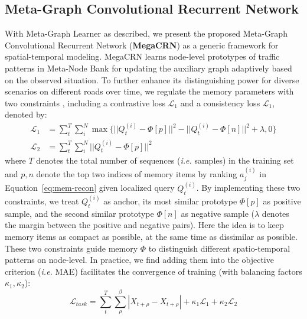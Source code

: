 \documentclass[letterpaper]{article} \usepackage{aaai23}  \usepackage{times}  \usepackage{helvet}  \usepackage{courier}  \usepackage[hyphens]{url}  \usepackage{graphicx} \urlstyle{rm} \def\UrlFont{\rm}  \usepackage{natbib}  \usepackage{caption} \usepackage{multirow}
\begin{document}
\subsection{Meta-Graph Convolutional Recurrent Network}
With Meta-Graph Learner as described, we present the proposed Meta-Graph Convolutional Recurrent Network (\textbf{MegaCRN}) as a generic framework for spatial-temporal modeling. MegaCRN learns node-level prototypes of traffic patterns in Meta-Node Bank for updating  the auxiliary graph adaptively based on the observed situation. To further enhance its distinguishing power for diverse scenarios on different roads over time, we regulate the memory parameters with two constraints \cite{gong2019memorizing, park2020learning}, including a contrastive loss $\mathcal{L}_{1}$ and a consistency loss $\mathcal{L}_{1}$, denoted by:
\begin{equation} \label{eq:mem-loss}
	    \begin{aligned}
\mathcal{L}_{1} & = \mathop{\sum}_t^T \mathop{\sum}_i^N \max\{||Q_t^{(i)} - \Phi[p]||^2 - ||Q_t^{(i)} - \Phi[n]||^2 + \lambda, 0\}\\
		\mathcal{L}_{2} & = \mathop{\sum}_t^T \mathop{\sum}_i^N ||Q_t^{(i)} - \Phi[p]||^2 
	    \end{aligned}
\end{equation}
where $T$ denotes the total number of sequences (\textit{i.e.} samples) in the training set and $p, n$ denote the top two indices of memory items by ranking $a_j^{(i)}$ in Equation~\ref{eq:mem-recon} given localized query $Q_t^{(i)}$. By implementing these two constraints, we treat $Q_{t}^{(i)}$ as anchor, its most similar prototype $\Phi[p]$ as positive sample, and the second similar prototype $\Phi[n]$ as negative sample ($\lambda$ denotes the margin between the positive and negative pairs). Here the idea is to keep memory items as compact as possible, at the same time as dissimilar as possible. These two constraints guide memory $\Phi$ to distinguish different spatio-temporal patterns on node-level. In practice, we find adding them into the objective criterion (\textit{i.e.} MAE) facilitates the convergence of training (with balancing factors $\kappa_1, \kappa_2$):
\begin{equation}    \label{eq:task-loss}
    \mathcal{L}_{task} = \mathop{\sum}_t^T \mathop{\sum}_\rho^\beta |\hat{X}_{t+\rho} - X_{t+\rho}| + \kappa_1 \mathcal{L}_{1} + \kappa_2 \mathcal{L}_{2}
\end{equation}
\end{document}
